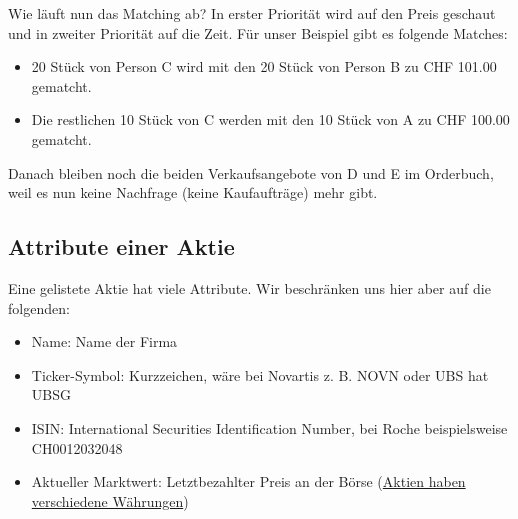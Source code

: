\documentclass{article}
\begin{document}
Wie läuft nun das Matching ab? In erster Priorität wird auf den Preis geschaut und in zweiter Priorität auf die Zeit. Für unser Beispiel gibt es folgende Matches:
\begin{itemize}
    \item 20 Stück von Person C wird mit den 20 Stück von Person B zu CHF 101.00 gematcht.
    \item Die restlichen 10 Stück von C werden mit den 10 Stück von A zu CHF 100.00 gematcht.
\end{itemize}
Danach bleiben noch die beiden Verkaufsangebote von D und E im Orderbuch, weil es nun keine Nachfrage (keine Kaufaufträge) mehr gibt.

\subsection{Attribute einer Aktie}
Eine gelistete Aktie hat viele Attribute. Wir beschränken uns hier aber auf die folgenden:
\begin{itemize}
    \item Name: Name der Firma
    \item Ticker-Symbol: Kurzzeichen, wäre bei Novartis z. B. NOVN oder UBS hat UBSG
    \item ISIN: International Securities Identification Number, bei Roche beispielsweise CH0012032048
    \item Aktueller Marktwert: Letztbezahlter Preis an der Börse (\underline{Aktien haben verschiedene Währungen})
\end{itemize}
\end{document}

